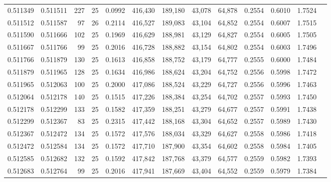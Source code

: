 \begin{tabular}{rrrrrrrrrrrrr}
0.511349 & 0.511511 &   227 &  25 &                                     0.0992 & 416,430 & 189,180 &  43,078 &  64,878 & 0.2554 & 0.6010 & 1.7524 \\
0.511512 & 0.511587 &    97 &  26 &                                     0.2114 & 416,527 & 189,083 &  43,104 &  64,852 & 0.2554 & 0.6007 & 1.7515 \\
0.511590 & 0.511666 &   102 &  25 &                                     0.1969 & 416,629 & 188,981 &  43,129 &  64,827 & 0.2554 & 0.6005 & 1.7505 \\
0.511667 & 0.511766 &    99 &  25 &                                     0.2016 & 416,728 & 188,882 &  43,154 &  64,802 & 0.2554 & 0.6003 & 1.7496 \\
0.511766 & 0.511879 &   130 &  25 &                                     0.1613 & 416,858 & 188,752 &  43,179 &  64,777 & 0.2555 & 0.6000 & 1.7484 \\
0.511879 & 0.511965 &   128 &  25 &                                     0.1634 & 416,986 & 188,624 &  43,204 &  64,752 & 0.2556 & 0.5998 & 1.7472 \\
0.511965 & 0.512063 &   100 &  25 &                                     0.2000 & 417,086 & 188,524 &  43,229 &  64,727 & 0.2556 & 0.5996 & 1.7463 \\
0.512064 & 0.512178 &   140 &  25 &                                     0.1515 & 417,226 & 188,384 &  43,254 &  64,702 & 0.2557 & 0.5993 & 1.7450 \\
0.512178 & 0.512299 &   133 &  25 &                                     0.1582 & 417,359 & 188,251 &  43,279 &  64,677 & 0.2557 & 0.5991 & 1.7438 \\
0.512299 & 0.512367 &    83 &  25 &                                     0.2315 & 417,442 & 188,168 &  43,304 &  64,652 & 0.2557 & 0.5989 & 1.7430 \\
0.512367 & 0.512472 &   134 &  25 &                                     0.1572 & 417,576 & 188,034 &  43,329 &  64,627 & 0.2558 & 0.5986 & 1.7418 \\
0.512472 & 0.512584 &   134 &  25 &                                     0.1572 & 417,710 & 187,900 &  43,354 &  64,602 & 0.2558 & 0.5984 & 1.7405 \\
0.512585 & 0.512682 &   132 &  25 &                                     0.1592 & 417,842 & 187,768 &  43,379 &  64,577 & 0.2559 & 0.5982 & 1.7393 \\
0.512683 & 0.512764 &    99 &  25 &                                     0.2016 & 417,941 & 187,669 &  43,404 &  64,552 & 0.2559 & 0.5979 & 1.7384 \\

\end{tabular}
